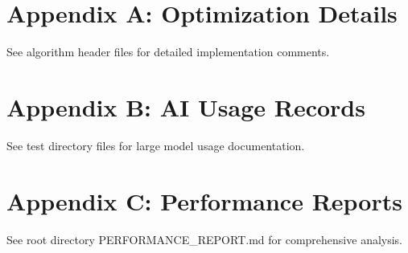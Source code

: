 \documentclass[11pt]{article}
\begin{document}
\appendix

\section{Appendix A: Optimization Details}
See algorithm header files for detailed implementation comments.

\section{Appendix B: AI Usage Records}
See test directory files for large model usage documentation.

\section{Appendix C: Performance Reports}
See root directory PERFORMANCE\_REPORT.md for comprehensive analysis.
\end{document}
